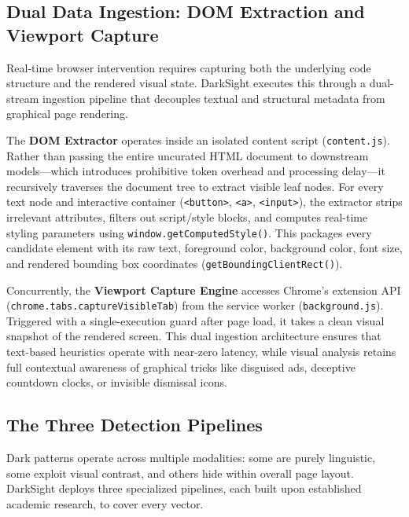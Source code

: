\documentclass[11pt,a4paper]{article}
\begin{document}
\subsection{Dual Data Ingestion: DOM Extraction and Viewport Capture}
\label{subsec:ingestion}

Real-time browser intervention requires capturing both the underlying code structure and the rendered visual state. DarkSight executes this through a dual-stream ingestion pipeline that decouples textual and structural metadata from graphical page rendering.

The \textbf{DOM Extractor} operates inside an isolated content script (\texttt{content.js}). Rather than passing the entire uncurated HTML document to downstream models—which introduces prohibitive token overhead and processing delay—it recursively traverses the document tree to extract visible leaf nodes. For every text node and interactive container (\texttt{<button>}, \texttt{<a>}, \texttt{<input>}), the extractor strips irrelevant attributes, filters out script/style blocks, and computes real-time styling parameters using \texttt{window.getComputedStyle()}. This packages every candidate element with its raw text, foreground color, background color, font size, and rendered bounding box coordinates (\texttt{getBoundingClientRect()}).

Concurrently, the \textbf{Viewport Capture Engine} accesses Chrome's extension API (\texttt{chrome.tabs.captureVisibleTab}) from the service worker (\texttt{background.js}). Triggered with a single-execution guard after page load, it takes a clean visual snapshot of the rendered screen. This dual ingestion architecture ensures that text-based heuristics operate with near-zero latency, while visual analysis retains full contextual awareness of graphical tricks like disguised ads, deceptive countdown clocks, or invisible dismissal icons.

\subsection{The Three Detection Pipelines}
\label{subsec:detection_pipelines}

Dark patterns operate across multiple modalities: some are purely linguistic, some exploit visual contrast, and others hide within overall page layout. DarkSight deploys three specialized pipelines, each built upon established academic research, to cover every vector.
\end{document}
